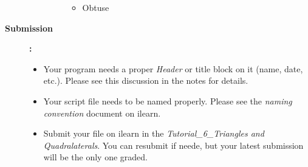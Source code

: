 \documentclass[12pt]{article}
\newcommand{\MNUM}{6} %
\newcommand{\TNAME}{Triangles and Quadralaterals} %
\begin{document}
\begin{description}
\begin{description}
\begin{enumerate}
\begin{itemize}
\item Obtuse
\end{itemize}
			\end{enumerate}
%	
	
			\end{description}
			
	\newpage
\item [\textbf{Submission }]\textbf{:} \\
			\begin{itemize}
				\item Your program needs a proper {\it Header} or title block on it (name, date, etc.). Please see this discussion in the notes for details.\\
				\item Your script file needs to be named properly. Please see the {\it naming convention} document on ilearn. \\
				\item Submit your file on ilearn in the {\it Tutorial\_\MNUM\_\TNAME}. You can resubmit if neede, but your latest submission will be the only one graded.\\

			\end{itemize}
   	
    	\end{description}
 
\end{document}
